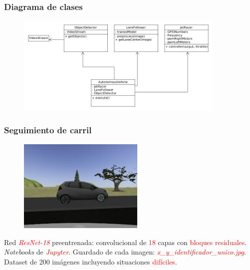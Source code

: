 \documentclass{beamer}
\begin{document}
\begin{frame}
	\frametitle{Diagrama de clases}
	\begin{figure}
		\centering
		\includegraphics[width=10cm]{figs/diagram6}
	\end{figure}
\end{frame}

\begin{frame}
	\frametitle{Seguimiento de carril}
	\begin{figure}
		\centering
		\includegraphics[width=6cm]{figs/trainedDifficult}
	\end{figure}
	\begin{outline}
		\1 Red \textcolor{red}{\textit{ResNet-18}} preentrenada: convolucional de \textcolor{red}{18} capas con \textcolor{red}{bloques residuales}.
		\1 \textit{Notebooks} de \textcolor{red}{\textit{Jupyter}}.
		\1 Guardado de cada imagen: \textcolor{red}{\textit{x\_y\_identificador\_unico.jpg}}.
		\1 Dataset de 200 imágenes incluyendo situaciones \textcolor{red}{difíciles}.
	\end{outline}
\end{frame}
\end{document}

